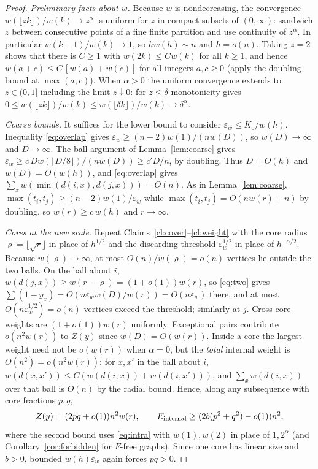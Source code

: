 \documentclass[11pt,a4paper]{article}
\theoremstyle{definition}
\newcommand{\eps}{\varepsilon}
\begin{document}
\begin{proof}
\emph{Preliminary facts about $w$.} Because $w$ is nondecreasing, the convergence $w(\lfloor zk\rfloor)/w(k)\to z^\alpha$ is uniform for $z$ in compact subsets of $(0,\infty)$: sandwich $z$ between consecutive points of a fine finite partition and use continuity of $z^\alpha$. In particular $w(k+1)/w(k)\to1$, so $hw(h)\sim n$ and $h=o(n)$. Taking $z=2$ shows that there is $C\ge1$ with $w(2k)\le Cw(k)$ for all $k\ge1$, and hence $w(a+c)\le C\,[w(a)+w(c)]$ for all integers $a,c\ge0$ (apply the doubling bound at $\max(a,c)$). When $\alpha>0$ the uniform convergence extends to $z\in(0,1]$ including the limit $z\downarrow0$: for $z\le\delta$ monotonicity gives $0\le w(\lfloor zk\rfloor)/w(k)\le w(\lfloor\delta k\rfloor)/w(k)\to\delta^\alpha$.

\emph{Coarse bounds.} It suffices for the lower bound to consider $\eps_w\le K_0/w(h)$. Inequality \eqref{eq:overlap} gives $\eps_w\ge(n-2)w(1)/(nw(D))$, so $w(D)\to\infty$ and $D\to\infty$. The ball argument of Lemma~\ref{lem:coarse} gives $\eps_w\ge c\,Dw(\lfloor D/8\rfloor)/(nw(D))\ge c'D/n$, by doubling. Thus $D=O(h)$ and $w(D)=O(w(h))$, and \eqref{eq:overlap} gives $\sum_xw(\min(d(i,x),d(j,x)))=O(n)$. As in Lemma~\ref{lem:coarse}, $\max(t_i,t_j)\ge(n-2)w(1)/\eps_w$ while $\max(t_i,t_j)=O(nw(r)+n)$ by doubling, so $w(r)\ge c\,w(h)$ and $r\to\infty$.

\emph{Cores at the new scale.} Repeat Claims~\ref{cl:cover}--\ref{cl:weight} with the core radius $\varrho=\lfloor\sqrt r\rfloor$ in place of $h^{1/2}$ and the discarding threshold $\eps_w^{1/2}$ in place of $h^{-\alpha/2}$. Because $w(\varrho)\to\infty$, at most $O(n)/w(\varrho)=o(n)$ vertices lie outside the two balls. On the ball about $i$, $w(d(j,x))\ge w(r-\varrho)=(1+o(1))w(r)$, so \eqref{eq:two} gives $\sum(1-y_x)=O(n\eps_w w(D)/w(r))=O(n\eps_w)$ there, and at most $O(n\eps_w^{1/2})=o(n)$ vertices exceed the threshold; similarly at $j$. Cross-core weights are $(1+o(1))w(r)$ uniformly. Exceptional pairs contribute $o(n^2w(r))$ to $Z(y)$ since $w(D)=O(w(r))$. Inside a core the largest weight need not be $o(w(r))$ when $\alpha=0$, but the \emph{total} internal weight is $O(n^2)=o(n^2w(r))$: for $x,x'$ in the ball about $i$, $w(d(x,x'))\le C(w(d(i,x))+w(d(i,x')))$, and $\sum_xw(d(i,x))$ over that ball is $O(n)$ by the radial bound. Hence, along any subsequence with core fractions $p,q$,
\[
 Z(y)=(2pq+o(1))n^2w(r),\qquad E_{\rm internal}\ge(2b(p^2+q^2)-o(1))n^2,
\]
where the second bound uses \eqref{eq:intra} with $w(1),w(2)$ in place of $1,2^\alpha$ (and Corollary~\ref{cor:forbidden} for $F$-free graphs). Since one core has linear size and $b>0$, bounded $w(h)\eps_w$ again forces $pq>0$.


\end{proof}
\end{document}
